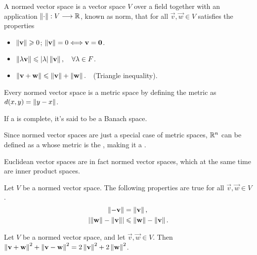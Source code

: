 \begin{defn}\label{def:normed-vector-space}
    A normed vector space is a vector space $V$ over a field together with an application $\appl{\vnorm{\cdot}}{V}{\R}$, 
    known as norm, that for all $\vec{v}, \vec{w}\in V$ satisfies the properties
\begin{itemize}[itemsep = -2pt]
\item $\left\Vert \mathbf{v} \right\Vert \geqslant 0$; $\left\Vert \mathbf{v} \right\Vert = 0\Longleftrightarrow \mathbf{v} = \mathbf{0}$.
\item $\left\Vert \lambda\mathbf{v} \right\Vert\leqslant\abs{\lambda}\left\Vert \mathbf{v} \right\Vert,\quad\forall\lambda\in F$.
\item $\left\Vert \mathbf{v} + \mathbf{w} \right\Vert \leqslant \left\Vert \mathbf{v} \right\Vert + \left\Vert \mathbf{w} \right\Vert.\quad$(Triangle inequality).
\end{itemize}
\end{defn}

\begin{prop}
Every normed vector space is a metric space by defining the metric as $d(x, y) = \left\Vert y - x \right\Vert$. 
\end{prop}

\begin{note}
    If a  is complete, it's said to be a Banach space.
\end{note}

Since normed vector spaces are just a special case of metric spaces, $\Rtn$ can be defined as a 
whose metric is the , making it a .

\begin{note}
    Euclidean vector spaces are in fact normed vector spaces, which at the same time are inner product spaces.
\end{note}

\begin{prop}
    Let $V$ be a normed vector space. The following properties are true for all $\vec{v}, \vec{w}\in V$.
    \begin{align}
        \left\Vert -\mathbf{v} \right\Vert &= \left\Vert \mathbf{v} \right\Vert, \\
        \abs{\left\Vert \mathbf{w} \right\Vert - \left\Vert \mathbf{v} \right\Vert} &\leqslant \left\Vert \mathbf{w} \right\Vert - \left\Vert \mathbf{v} \right\Vert.
    \end{align}
\end{prop}

\begin{prop}
    Let $V$ be a normed vector space, and let $\vec{v}, \vec{w}\in V$. Then $\left\Vert \mathbf{v} + \mathbf{w} \right\Vert^2 + \left\Vert \mathbf{v} 
    - \mathbf{w} \right\Vert^2 = 2\left\Vert \mathbf{v} \right\Vert^2 + 2\left\Vert \mathbf{w} \right\Vert^2$.
\end{prop}

